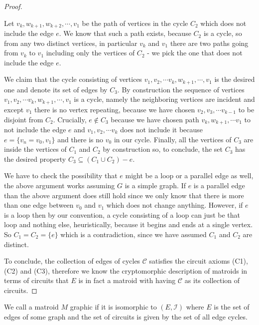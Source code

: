\begin{proof}
\begin{enumerate}
    Let $v_k, w_{k+1}, w_{k+2}, \cdots, v_1$ be the path of vertices in the cycle $C_2$ which does not include the edge $e$. We know that such a path exists, because $C_2$ is a cycle, so from any two distinct vertices, in particular $v_k$ and $v_1$ there are two paths going from $v_k$ to $v_1$ including only the vertices of $C_2$ - we pick the one that does not include the edge $e$.
    
    We claim that the cycle consisting of vertices $v_1, v_2, \cdots v_k, w_{k+1}, \cdots , v_1$ is the desired one and denote its set of edges by $C_3$. By construction the sequence of vertices $v_1, v_2, \cdots v_k, w_{k+1}, \cdots , v_1$ is a cycle, namely the neighboring vertices are incident and except $v_1$ there is no vertex repeating, because we have chosen $v_2, v_3, \cdots v_{k-1}$ to be disjoint from $C_2$. Crucially, $e \notin C_3$ because we have chosen path $v_k, w_{k+1}, \cdots v_1$ to not include the edge $e$ and $v_1, v_2, \cdots v_k$ does not include it because $e = \{v_n = v_0, v_1\}$ and there is no $v_0$ in our cycle. Finally, all the vertices of $C_3$ are inside the vertices of $C_1$ and $C_2$ by construction so, to conclude, the set $C_3$ has the desired property $C_3 \subseteq (C_1 \cup C_2) - e$.
    
    We have to check the possibility that $e$ might be a loop or a parallel edge as well, the above argument works assuming $G$ is a simple graph. If $e$ is a parallel edge than the above argument does still hold since we only know that there is more than one edge between $v_0$
    and $v_1$ which does not change anything. However, if $e$ is a loop then by our convention, a cycle consisting of a loop can just be that loop and nothing else, heuristically, because it begins and ends at a single vertex. So $C_1 = C_2 = \{e\}$ which is a contradiction, since we have assumed $C_1$ and $C_2$ are distinct.

\end{enumerate}

To conclude, the collection of edges of cycles $\mathcal{C}$ satisfies the circuit axioms (C1), (C2) and (C3), therefore we know the cryptomorphic description of matroids in terms of circuits that $E$ is in fact a matroid with having $\mathcal{C}$ as its collection of circuits.

\end{proof}


\begin{defn}
    We call a matroid $M$ graphic if it is isomorphic to $(E, \mathcal{I})$ where $E$ is the set of edges of some graph and the set of circuits is given by the set of all edge cycles.
\end{defn}



